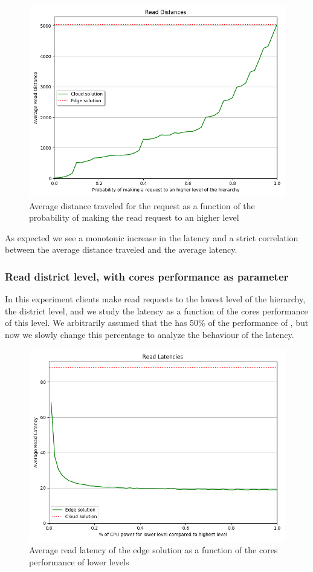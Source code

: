 \begin{figure}[H]
    \centering
    \includegraphics[width=0.86\linewidth]{Figures/Evaluation/read-all-distance.png}
     \caption{Average distance traveled for the request as a function of the probability of making the read request to an higher level}
    \label{fig:/read-all-distance}
\end{figure}

As expected we see a monotonic increase in the latency and a strict correlation between the average distance traveled and the average latency.

\subsubsection{Read district level, with cores performance as parameter}
In this experiment clients make read requests to the lowest level of the hierarchy, the district level, and we study the latency as a function of the cores performance of this level.
We arbitrarily assumed that the  has 50\% of the performance of , but now we slowly change this percentage to analyze the behaviour of the latency.

\begin{figure}[H]
    \centering
    \includegraphics[width=0.86\linewidth]{Figures/Evaluation/read-district-cpu-latency.png}
    \caption{Average read latency of the edge solution as a function of the cores performance of lower levels}
    \label{fig:/read-district-cpu-latency}
\end{figure}


